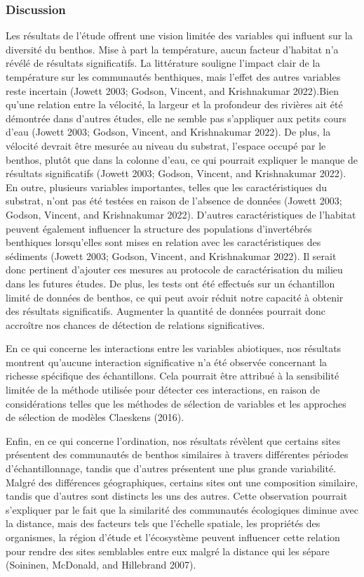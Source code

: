 \documentclass[
]{article}
\begin{document}
\hypertarget{discussion}{%
\subsubsection{Discussion}\label{discussion}}

Les résultats de l'étude offrent une vision limitée des variables qui
influent sur la diversité du benthos. Mise à part la température, aucun
facteur d'habitat n'a révélé de résultats significatifs. La littérature
souligne l'impact clair de la température sur les communautés
benthiques, mais l'effet des autres variables reste incertain (Jowett
2003; Godson, Vincent, and Krishnakumar 2022).Bien qu'une relation entre
la vélocité, la largeur et la profondeur des rivières ait été démontrée
dans d'autres études, elle ne semble pas s'appliquer aux petits cours
d'eau (Jowett 2003; Godson, Vincent, and Krishnakumar 2022). De plus, la
vélocité devrait être mesurée au niveau du substrat, l'espace occupé par
le benthos, plutôt que dans la colonne d'eau, ce qui pourrait expliquer
le manque de résultats significatifs (Jowett 2003; Godson, Vincent, and
Krishnakumar 2022). En outre, plusieurs variables importantes, telles
que les caractéristiques du substrat, n'ont pas été testées en raison de
l'absence de données (Jowett 2003; Godson, Vincent, and Krishnakumar
2022). D'autres caractéristiques de l'habitat peuvent également
influencer la structure des populations d'invertébrés benthiques
lorsqu'elles sont mises en relation avec les caractéristiques des
sédiments (Jowett 2003; Godson, Vincent, and Krishnakumar 2022). Il
serait donc pertinent d'ajouter ces mesures au protocole de
caractérisation du milieu dans les futures études. De plus, les tests
ont été effectués sur un échantillon limité de données de benthos, ce
qui peut avoir réduit notre capacité à obtenir des résultats
significatifs. Augmenter la quantité de données pourrait donc accroître
nos chances de détection de relations significatives.

En ce qui concerne les interactions entre les variables abiotiques, nos
résultats montrent qu'aucune interaction significative n'a été observée
concernant la richesse spécifique des échantillons. Cela pourrait être
attribué à la sensibilité limitée de la méthode utilisée pour détecter
ces interactions, en raison de considérations telles que les méthodes de
sélection de variables et les approches de sélection de modèles
Claeskens (2016).

Enfin, en ce qui concerne l'ordination, nos résultats révèlent que
certains sites présentent des communautés de benthos similaires à
travers différentes périodes d'échantillonnage, tandis que d'autres
présentent une plus grande variabilité. Malgré des différences
géographiques, certains sites ont une composition similaire, tandis que
d'autres sont distincts les uns des autres. Cette observation pourrait
s'expliquer par le fait que la similarité des communautés écologiques
diminue avec la distance, mais des facteurs tels que l'échelle spatiale,
les propriétés des organismes, la région d'étude et l'écosystème peuvent
influencer cette relation pour rendre des sites semblables entre eux
malgré la distance qui les sépare (Soininen, McDonald, and Hillebrand
2007).
\end{document}
